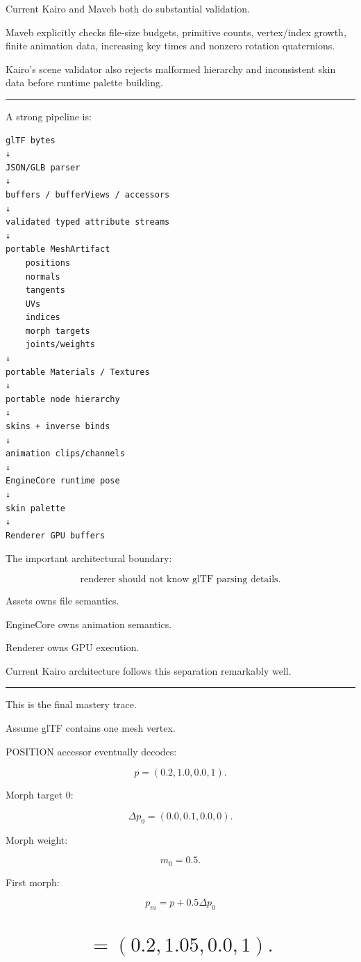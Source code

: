Current Kairo and Maveb both do substantial validation.

Maveb explicitly checks file-size budgets, primitive counts, vertex/index growth, finite animation data, increasing key times and nonzero rotation quaternions.

Kairo's scene validator also rejects malformed hierarchy and inconsistent skin data before runtime palette building.

\begin{center}\rule{0.5\linewidth}{0.5pt}\end{center}

A strong pipeline is:

\begin{verbatim}
glTF bytes
↓
JSON/GLB parser
↓
buffers / bufferViews / accessors
↓
validated typed attribute streams
↓
portable MeshArtifact
    positions
    normals
    tangents
    UVs
    indices
    morph targets
    joints/weights
↓
portable Materials / Textures
↓
portable node hierarchy
↓
skins + inverse binds
↓
animation clips/channels
↓
EngineCore runtime pose
↓
skin palette
↓
Renderer GPU buffers
\end{verbatim}

The important architectural boundary:

\[
\boxed{
\text{renderer should not know glTF parsing details}.
}
\]

Assets owns file semantics.

EngineCore owns animation semantics.

Renderer owns GPU execution.

Current Kairo architecture follows this separation remarkably well.

\begin{center}\rule{0.5\linewidth}{0.5pt}\end{center}

This is the final mastery trace.

Assume glTF contains one mesh vertex.

POSITION accessor eventually decodes:

\[
p=
(0.2,1.0,0.0,1).
\]

Morph target 0:

\[
\Delta p_0=
(0.0,0.1,0.0,0).
\]

Morph weight:

\[
m_0=0.5.
\]

First morph:

\[
p_m
=
p+
0.5\Delta p_0
\]

\section{\texorpdfstring{\[
=
(0.2,1.05,0.0,1).
\]}{
=
(0.2,1.05,0.0,1).
}}\label{04-visual-computing-ii-ch041-section}

